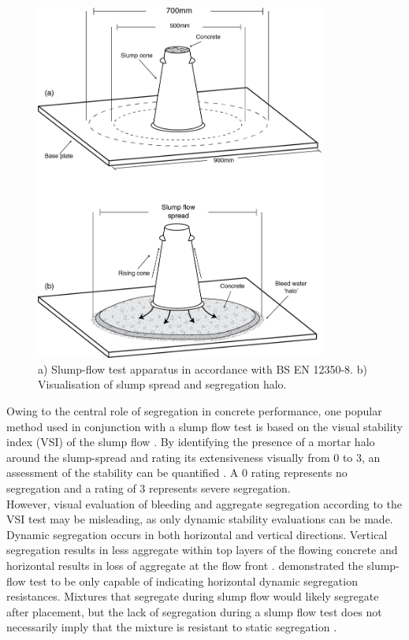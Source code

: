 \begin{figure}[H]
\centering
\includegraphics[width=0.85\textwidth]{slumptest.png}
\caption{\label{fig:slumptest} a) Slump-flow test apparatus in accordance with BS EN 12350-8. b) Visualisation of slump spread and segregation halo.}
\end{figure}
\noindent
Owing to the central role of segregation in concrete performance, one popular method used in conjunction with a slump flow test is based on the visual stability index (VSI) of the slump flow \citep{VSI}. By identifying the presence of a mortar halo around the slump-spread and rating its extensiveness visually from 0 to 3, an assessment of the stability can be quantified \citep{pci03}. A 0 rating represents no segregation and a rating of 3 represents severe segregation.\\
\newline
\noindent
However, visual evaluation of bleeding and aggregate segregation according to the VSI test may be misleading, as only dynamic stability evaluations can be made. Dynamic segregation occurs in both horizontal and vertical directions. Vertical segregation results in less aggregate within top layers of the flowing concrete and horizontal results in loss of aggregate at the flow front \citep{HOSSEI17}. \citet{TREGGER12} demonstrated the slump-flow test to be only capable of indicating horizontal dynamic segregation resistances. Mixtures that segregate during slump flow would likely segregate after placement, but the lack of segregation during a slump flow test does not necessarily imply that the mixture is resistant to static segregation \citep{bonen05}.
